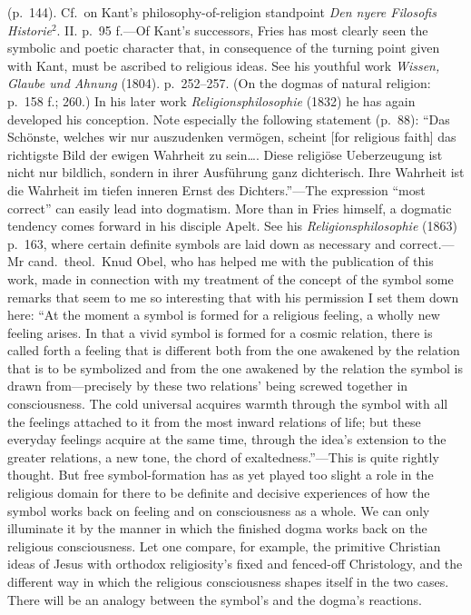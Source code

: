 \documentclass[12pt,a4paper]{book}
\newcommand{\opage}[1]{\marginnote{\footnotesize\textit{[#1]}}}
\begin{document}
 (p.~144). Cf.\ on Kant's philosophy-of-religion standpoint \emph{Den nyere Filosofis Historie}$^2$. II.
p.~95 f.---Of Kant's successors, Fries has most clearly seen the symbolic and poetic character that,
in consequence of the turning point given with Kant, must be ascribed to religious ideas. See his
youthful work \emph{Wissen, Glaube und Ahnung} (1804). p.~252--257. (On the dogmas of natural
religion: p.~158 f.; 260.) In his later work \emph{Religionsphilosophie} (1832) he has again developed
his conception. Note especially the following statement (p.~88): ``Das Schönste, welches wir nur
auszudenken vermögen, scheint [for religious faith] das richtigste Bild der ewigen Wahrheit zu
sein\ldots. Diese religiöse Ueberzeugung ist nicht nur bildlich, sondern in ihrer Ausführung ganz
dichterisch. Ihre Wahrheit ist die Wahrheit im tiefen inneren Ernst des Dichters.''---The expression
``most correct'' can easily lead into dogmatism. More than in Fries himself, a dogmatic tendency comes
forward in his disciple Apelt. See his \emph{Religionsphilosophie} (1863) p.~163, where certain
definite symbols are laid down as necessary and correct.---Mr cand.\ theol.\ Knud Obel, who has helped
me with the publication of this work, made in connection with my treatment of the concept of the symbol
some remarks that seem to me so interesting that with his permission I set them down here: ``At the
moment a symbol is formed for a religious feeling, a wholly new feeling arises. In that a vivid symbol
is formed for a cosmic relation, there is called forth a feeling that is different both from the one
awakened by the relation that is to be symbolized and from the one awakened by the relation the symbol
is drawn from---precisely by these two relations' being screwed together in consciousness. The cold
universal acquires 
\opage{253}warmth through the symbol with all the feelings attached to it from the most inward
relations of life; but these everyday feelings acquire at the same time, through the idea's extension to
the greater relations, a new tone, the chord of exaltedness.''---This is quite rightly thought. But free
symbol-formation has as yet played too slight a role in the religious domain for there to be definite
and decisive experiences of how the symbol works back on feeling and on consciousness as a whole. We can
only illuminate it by the manner in which the finished dogma works back on the religious consciousness.
Let one compare, for example, the primitive Christian ideas of Jesus with orthodox religiosity's fixed
and fenced-off Christology, and the different way in which the religious consciousness shapes itself in
the two cases. There will be an analogy between the symbol's and the dogma's reactions.
\end{document}
